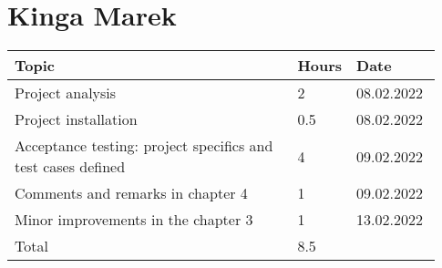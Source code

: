 \section*{Kinga Marek}
\begin{longtable}{@{}p{0.67\linewidth} p{0.06\linewidth} p{0.20\linewidth}@{}}
    \toprule[1.5pt]
    Topic &  Hours & Date \\ \hline

    Project analysis & 2 & 08.02.2022\\
    Project installation & 0.5 & 08.02.2022\\
    Acceptance testing: project specifics and test cases defined & 4 & 09.02.2022\\
    Comments and remarks in chapter 4 & 1 & 09.02.2022\\
    Minor improvements in the chapter 3 & 1 & 13.02.2022\\
    \hline
    Total & 8.5 & \\ 
    \bottomrule[1.5pt]
\end{longtable}